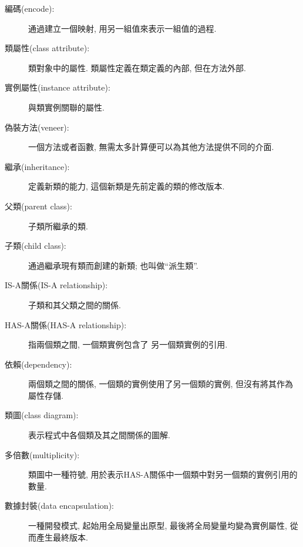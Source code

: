 \documentclass[10pt]{book}
\begin{document}
\begin{description}

\item[編碼(encode):] 通過建立一個映射, 用另一組值來表示一組值的過程.

\item[類屬性(class attribute):] 類對象中的屬性. 類屬性定義在類定義的內部, 
但在方法外部. 

\item[實例屬性(instance attribute):] 與類實例關聯的屬性.

\item[偽裝方法(veneer):] 一個方法或者函數, 無需太多計算便可以為其他方法提供不同的介面. 

\item[繼承(inheritance):] 定義新類的能力, 這個新類是先前定義的類的修改版本. 

\item[父類(parent class):] 子類所繼承的類.

\item[子類(child class):] 通過繼承現有類而創建的新類; 也叫做``派生類''. 

\item[IS-A關係(IS-A relationship):] 子類和其父類之間的關係.

\item[HAS-A關係(HAS-A relationship):] 指兩個類之間, 一個類實例包含了
另一個類實例的引用.

\item[依賴(dependency):] 兩個類之間的關係, 
一個類的實例使用了另一個類的實例, 但沒有將其作為屬性存儲. 

\item[類圖(class diagram):] 表示程式中各個類及其之間關係的圖解. 

\item[多倍數(multiplicity):] 類圖中一種符號, 
用於表示HAS-A關係中一個類中對另一個類的實例引用的數量. 

\item[數據封裝(data encapsulation):] 一種開發模式, 
起始用全局變量出原型, 最後將全局變量均變為實例屬性, 從而產生最終版本. 

\end{description}
\end{document}
